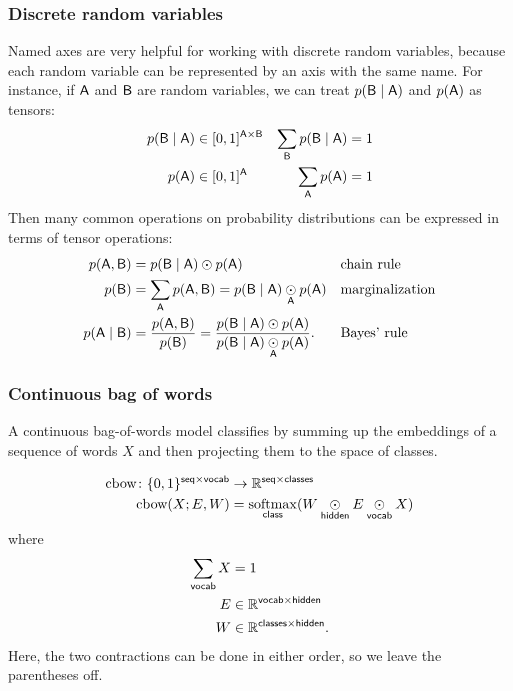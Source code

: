 \documentclass{article}
\newcommand{\reals}{\mathbb{R}}
\begin{document}
\subsubsection{Discrete random variables}

Named axes are very helpful for working with discrete random variables, because each random variable can be represented by an axis with the same name. For instance, if $\mathsf{A}$ and $\mathsf{B}$ are random variables, we can treat $p(\mathsf{B} \mid \mathsf{A})$ and $p(\mathsf{A})$ as tensors:
\begin{align*}
p(\mathsf{B} \mid \mathsf{A}) &\in [0, 1]^{\mathsf{A} \times \mathsf{B}} & \sum\limits_{\mathsf{B}} p(\mathsf{B}\mid \mathsf{A}) &= 1 \\
p(\mathsf{A}) &\in [0, 1]^{\mathsf{A}} & \sum\limits_{\mathsf{A}} p(\mathsf{A}) &= 1
\end{align*}
Then many common operations on probability distributions can be expressed in terms of tensor operations:
\begin{align*}
p(\mathsf{A}, \mathsf{B}) &= p(\mathsf{B} \mid \mathsf{A}) \odot p(\mathsf{A}) && \text{chain rule}\\
p(\mathsf{B}) &= \sum\limits_{\mathsf{A}} p(\mathsf{A}, \mathsf{B}) = p(\mathsf{B} \mid \mathsf{A}) \mathbin{\underset{\mathsf{A}}{\odot}} p(\mathsf{A}) && \text{marginalization} \\
p(\mathsf{A} \mid \mathsf{B}) &= \frac{p(\mathsf{A}, \mathsf{B})}{p(\mathsf{B})} = \frac{p(\mathsf{B} \mid \mathsf{A}) \odot p(\mathsf{A})}{p(\mathsf{B} \mid \mathsf{A}) \mathbin{\underset{\mathsf{A}}{\odot}} p(\mathsf{A})}. && \text{Bayes' rule}
\end{align*}

\subsubsection{Continuous bag of words}

A continuous bag-of-words model classifies by summing up the embeddings of a sequence of words $X$ and then projecting them to the space of classes. 

\begin{align*}
\text{cbow} \colon \{0, 1\}^{\name{seq} \times \name{vocab}} &\rightarrow \reals^{\name{seq} \times \name{classes}} \\
\text{cbow}(X; E, W) &= \nfun{class}{softmax} (W \ndot{hidden} E \ndot{vocab} X)
\end{align*}
where
\begin{align*}
\nsum{vocab} X &= 1 \\
E &\in \reals^{\name{vocab} \times \name{hidden}} \\
W &\in \reals^{\name{classes} \times \name{hidden}}.
\end{align*}
Here, the two contractions can be done in either order, so we leave the parentheses off.
\end{document}
